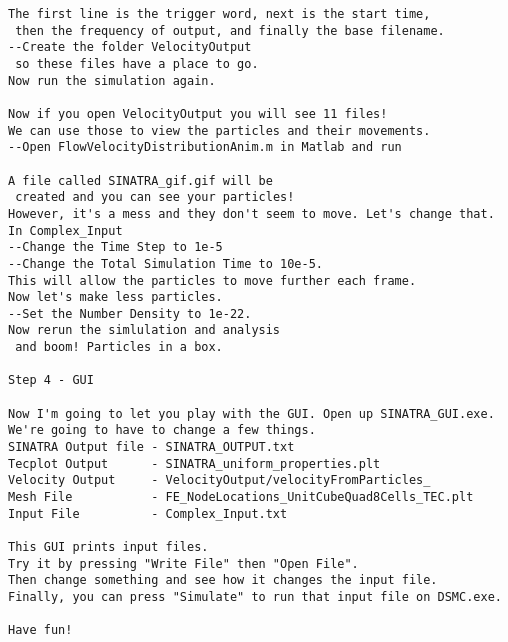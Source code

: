 \begin{verbatim}
The first line is the trigger word, next is the start time,
 then the frequency of output, and finally the base filename.
--Create the folder VelocityOutput 
 so these files have a place to go. 
Now run the simulation again. 

Now if you open VelocityOutput you will see 11 files! 
We can use those to view the particles and their movements.
--Open FlowVelocityDistributionAnim.m in Matlab and run

A file called SINATRA_gif.gif will be
 created and you can see your particles!
However, it's a mess and they don't seem to move. Let's change that. 
In Complex_Input 
--Change the Time Step to 1e-5 
--Change the Total Simulation Time to 10e-5.
This will allow the particles to move further each frame. 
Now let's make less particles.
--Set the Number Density to 1e-22.
Now rerun the simlulation and analysis
 and boom! Particles in a box. 

Step 4 - GUI

Now I'm going to let you play with the GUI. Open up SINATRA_GUI.exe. 
We're going to have to change a few things. 
SINATRA Output file - SINATRA_OUTPUT.txt
Tecplot Output      - SINATRA_uniform_properties.plt
Velocity Output     - VelocityOutput/velocityFromParticles_
Mesh File           - FE_NodeLocations_UnitCubeQuad8Cells_TEC.plt
Input File          - Complex_Input.txt

This GUI prints input files. 
Try it by pressing "Write File" then "Open File". 
Then change something and see how it changes the input file. 
Finally, you can press "Simulate" to run that input file on DSMC.exe.

Have fun!


\end{verbatim}